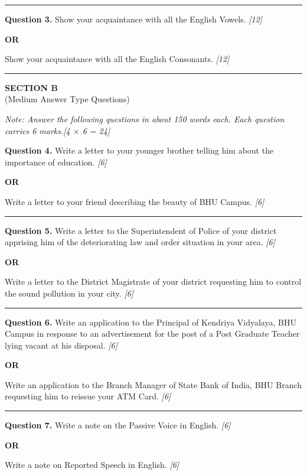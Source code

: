\documentclass[11pt,a4paper]{article}
\newcommand{\pts}[1]{\hfill \textit{[#1]}}
\begin{document}
\medskip\rule{\linewidth}{0.2pt}\medskip

\noindent \textbf{Question 3.} Show your acquaintance with all the English Vowels. \pts{12}
\begin{center}\textbf{OR}\end{center}
Show your acquaintance with all the English Consonants. \pts{12}

\bigskip
\rule{\linewidth}{0.2pt}
\bigskip

\begin{center}
  {\large\bfseries SECTION B}\\[2pt]
  {\normalsize (Medium Answer Type Questions)}
\end{center}

\noindent \textit{Note: Answer the following questions in about 150 words each. Each question carries 6 marks.}\pts{4 $\times$ 6 = 24}

\bigskip

\noindent \textbf{Question 4.} Write a letter to your younger brother telling him about the importance of education. \pts{6}
\begin{center}\textbf{OR}\end{center}
Write a letter to your friend describing the beauty of BHU Campus. \pts{6}

\medskip\rule{\linewidth}{0.2pt}\medskip

\noindent \textbf{Question 5.} Write a letter to the Superintendent of Police of your district apprising him of the deteriorating law and order situation in your area. \pts{6}
\begin{center}\textbf{OR}\end{center}
Write a letter to the District Magistrate of your district requesting him to control the sound pollution in your city. \pts{6}

\medskip\rule{\linewidth}{0.2pt}\medskip

\noindent \textbf{Question 6.} Write an application to the Principal of Kendriya Vidyalaya, BHU Campus in response to an advertisement for the post of a Post Graduate Teacher lying vacant at his disposal. \pts{6}
\begin{center}\textbf{OR}\end{center}
Write an application to the Branch Manager of State Bank of India, BHU Branch requesting him to reissue your ATM Card. \pts{6}

\medskip\rule{\linewidth}{0.2pt}\medskip

\noindent \textbf{Question 7.} Write a note on the Passive Voice in English. \pts{6}
\begin{center}\textbf{OR}\end{center}
Write a note on Reported Speech in English. \pts{6}
\end{document}
